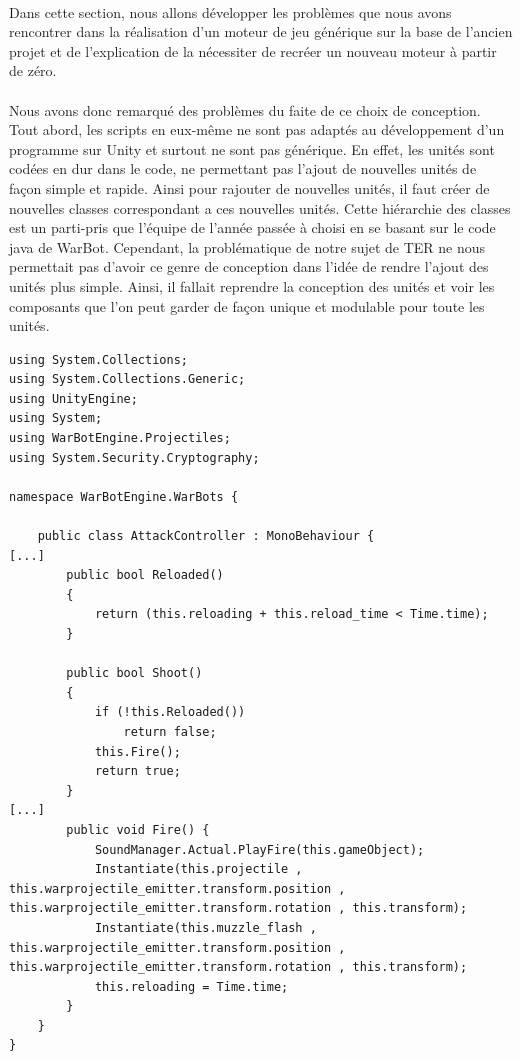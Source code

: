 \documentclass{report}
\begin{document}
\paragraph{} Dans cette section, nous allons développer les problèmes que nous avons rencontrer dans la réalisation d'un moteur de jeu générique sur la base de l'ancien projet et de l'explication de la nécessiter de recréer un nouveau moteur à partir de zéro.
\paragraph{} Nous avons donc remarqué des problèmes du faite de ce choix de conception. Tout abord, les scripts en eux-même ne sont pas adaptés au développement d'un programme sur Unity et surtout ne sont pas générique.  En effet, les unités sont codées en dur dans le code, ne permettant pas l'ajout de nouvelles unités de façon simple et rapide. Ainsi pour rajouter de nouvelles unités, il faut créer de nouvelles classes correspondant a ces nouvelles unités. Cette hiérarchie des classes est un parti-pris que l’équipe de l'année passée à choisi en se basant sur le code java de WarBot. Cependant, la problématique de notre sujet de TER ne nous permettait pas d'avoir ce genre de conception dans l'idée de rendre l'ajout des unités plus simple. Ainsi, il fallait reprendre la conception des unités et voir les composants que l'on peut garder de façon unique et modulable pour toute les unités.
\begin{lstlisting}[language={[Sharp]C}, caption= Code du script AttackController.cs de l'ancien projet]
using System.Collections;
using System.Collections.Generic;
using UnityEngine;
using System;
using WarBotEngine.Projectiles;
using System.Security.Cryptography;

namespace WarBotEngine.WarBots {

    public class AttackController : MonoBehaviour {
[...]
        public bool Reloaded()
        {
            return (this.reloading + this.reload_time < Time.time);
        }

        public bool Shoot()
        {
            if (!this.Reloaded())
                return false;
            this.Fire();
            return true;
        }
[...]
        public void Fire() {
            SoundManager.Actual.PlayFire(this.gameObject);
            Instantiate(this.projectile , this.warprojectile_emitter.transform.position , this.warprojectile_emitter.transform.rotation , this.transform);
            Instantiate(this.muzzle_flash , this.warprojectile_emitter.transform.position , this.warprojectile_emitter.transform.rotation , this.transform);
            this.reloading = Time.time;
        }
    }
}
\end{lstlisting}
\end{document}
